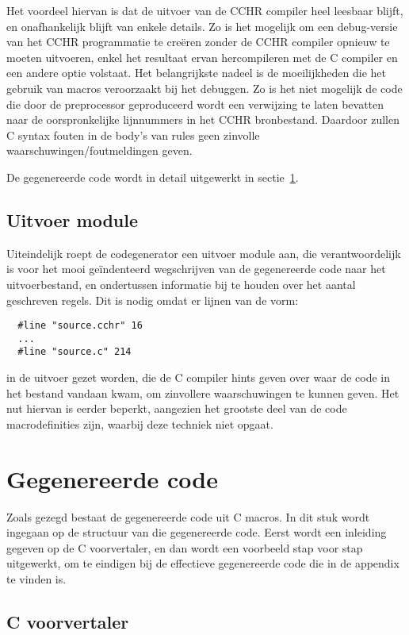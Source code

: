Het voordeel hiervan is dat de uitvoer van de CCHR compiler heel leesbaar blijft, en onafhankelijk blijft van enkele details. Zo is het mogelijk om een debug-versie van het CCHR programmatie te cre\"eren zonder de CCHR compiler opnieuw te moeten uitvoeren, enkel het resultaat ervan hercompileren met de C compiler en een andere optie volstaat. Het belangrijkste nadeel is de moeilijkheden die het gebruik van macros veroorzaakt bij het debuggen. Zo is het niet mogelijk de code die door de preprocessor geproduceerd wordt een verwijzing te laten bevatten naar de oorspronkelijke lijnnummers in het CCHR bronbestand. Daardoor zullen C syntax fouten in de body's van rules geen zinvolle waarschuwingen/foutmeldingen geven.

De gegenereerde code wordt in detail uitgewerkt in sectie~\ref{sec:gencode}.

\subsection{Uitvoer module} \label{sec:uitvoer}

Uiteindelijk roept de codegenerator een uitvoer module aan, die verantwoordelijk is voor het mooi ge\"indenteerd wegschrijven van de gegenereerde code naar het uitvoerbestand, en ondertussen informatie bij te houden over het aantal geschreven regels. Dit is nodig omdat er lijnen van de vorm: \begin{Verbatim}
  #line "source.cchr" 16
  ...
  #line "source.c" 214
\end{Verbatim}
in de uitvoer gezet worden, die de C compiler hints geven over waar de code in het bestand vandaan kwam, om zinvollere waarschuwingen te kunnen geven. Het nut hiervan is eerder beperkt, aangezien het grootste deel van de code macrodefinities zijn, waarbij deze techniek niet opgaat.

\section{Gegenereerde code} \label{sec:gencode}

Zoals gezegd bestaat de gegenereerde code uit C macros. In dit stuk wordt ingegaan op de structuur van die gegenereerde code. Eerst wordt een inleiding gegeven op de C voorvertaler, en dan wordt een voorbeeld stap voor stap uitgewerkt, om te eindigen bij de effectieve gegenereerde code die in de appendix te vinden is.

\subsection{C voorvertaler} \label{sec:preproc}


